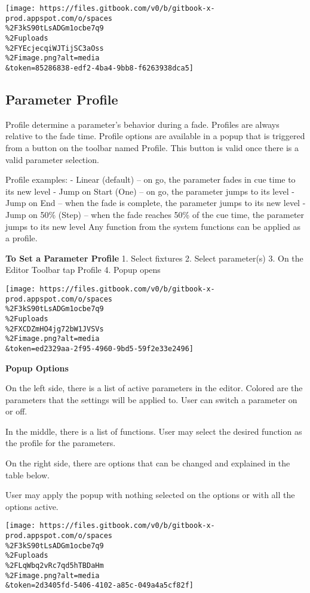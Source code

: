 \documentclass[
]{article}
\begin{document}
\texttt{[image: https://files.gitbook.com/v0/b/gitbook-x-prod.appspot.com/o/spaces\\\%2F3kS90tLsADGm1ocbe7q9\\\%2Fuploads\\\%2FYEcjecqiWJTijSC3aOss\\\%2Fimage.png?alt=media\\\&token=85286838-edf2-4ba4-9bb8-f6263938dca5]}

\hypertarget{parameter-profile}{%
\subsection{Parameter Profile}\label{parameter-profile}}

Profile determine a parameter's behavior during a fade.
Profiles are always relative to the fade time.
Profile options are available in a popup that is triggered from a button on the toolbar named Profile. This button is valid once there is a valid parameter selection.

Profile examples:
- Linear (default) -- on go, the parameter fades in cue time to its new level
- Jump on Start (One) -- on go, the parameter jumps to its level
- Jump on End -- when the fade is complete, the parameter jumps to its new level
- Jump on 50\% (Step) -- when the fade reaches 50\% of the cue time, the parameter jumps to its new level
Any function from the system functions can be applied as a profile.

\textbf{To Set a Parameter Profile}
1. Select fixtures
2. Select parameter(s)
3. On the Editor Toolbar tap Profile
4. Popup opens

\texttt{[image: https://files.gitbook.com/v0/b/gitbook-x-prod.appspot.com/o/spaces\\\%2F3kS90tLsADGm1ocbe7q9\\\%2Fuploads\\\%2FXCDZmHO4jg72bW1JVSVs\\\%2Fimage.png?alt=media\\\&token=ed2329aa-2f95-4960-9bd5-59f2e33e2496]}

\textbf{Popup Options}

On the left side, there is a list of active parameters in the editor. Colored are the parameters that the settings will be applied to. User can switch a parameter on or off.

In the middle, there is a list of functions. User may select the desired function as the profile for the parameters.

On the right side, there are options that can be changed and explained in the table below.

User may apply the popup with nothing selected on the options or with all the options active.

\texttt{[image: https://files.gitbook.com/v0/b/gitbook-x-prod.appspot.com/o/spaces\\\%2F3kS90tLsADGm1ocbe7q9\\\%2Fuploads\\\%2FLqWbq2vRc7qd5hTBDaHm\\\%2Fimage.png?alt=media\\\&token=2d3405fd-5406-4102-a85c-049a4a5cf82f]}
\end{document}
